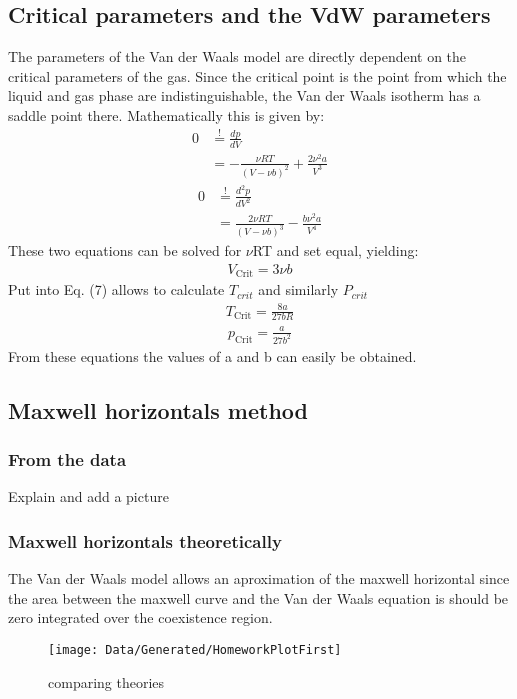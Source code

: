 \documentclass[a4paper,10pt,twocolumn]{article}
\begin{document}
    \subsection{Critical parameters and the VdW parameters}\label{subsec:criticalParams}
    The parameters of the Van der Waals model are directly dependent on the critical parameters of the gas.
    Since the critical point is the point from which the liquid and gas phase are indistinguishable, the Van der Waals isotherm has a saddle point there.
    Mathematically this is given by:
    \begin{equation}\label{eq:anh1}
    \begin{split}
        0 & \overset{!}{=}\frac{dp}{dV}\\
        & =-\frac{\nu R T}{(V-\nu b)^2}+\frac{2 \nu^2 a}{V^3}
    \end{split}
    \end{equation}
\begin{equation}\label{eq:anh2}
\begin{split}
    0 & \overset{!}{=}\frac{d^2p}{dV^2}\\
    & =\frac{2 \nu R T}{(V-\nu b)^3}-\frac{b \nu^2 a}{V^4}
\end{split}
\end{equation}
These two equations can be solved for $\nu$RT and set equal, yielding:
\begin{align}
    V_\text{Crit} = 3\nu b
\end{align}
Put into Eq. (7) allows to calculate $T_{crit}$ and similarly $P_{crit}$
\begin{align}
    T_\text{Crit}=\frac{8a}{27bR}
\end{align}
\begin{align}
    p_\text{Crit}=\frac{a}{27b^2}
\end{align}
    From these equations the values of a and b can easily be obtained.
    \subsection{Maxwell horizontals method}\label{subsec:maxwellMethod}
    \subsubsection{From the data}\label{subsubsec:maxwellFormData}
    Explain and add a picture
    \subsubsection{Maxwell horizontals theoretically}\label{subsec:maxwellFromTheory}
    The Van der Waals model allows an aproximation of the maxwell horizontal since the area between the maxwell curve and the Van der Waals equation is should be zero integrated over the
    coexistence region.
    \begin{figure}
        \begin{center}
            \texttt{[image: Data/Generated/HomeworkPlotFirst]}
            \caption[]{comparing theories}
            \label{fig:homeworkPlotOne}
        \end{center}
    \end{figure}
    
\end{document}
